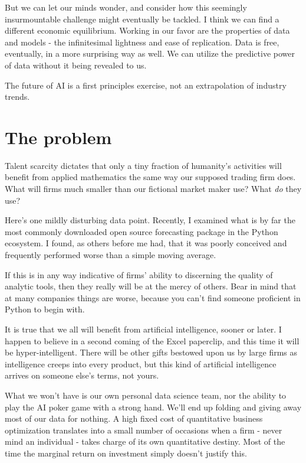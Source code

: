 But we can let our minds wonder, and consider how this seemingly insurmountable challenge might eventually be tackled. I think we can find a different economic equilibrium. Working in our favor are the properties of data and models - the infinitesimal lightness and ease of replication. Data is free, eventually, in a more surprising way as well. We can utilize the predictive power of data without it being revealed to us. 

The future of AI is a first principles exercise, not an extrapolation of industry trends. 


\section{The problem}

Talent scarcity dictates that only a tiny fraction of humanity's activities will benefit from applied mathematics the same way our supposed trading firm does. What will firms much smaller than our fictional market maker use? What {\em do} they use? 

Here's one mildly disturbing data point. Recently, I examined what is by far the most commonly downloaded open source forecasting package in the Python ecosystem. I found, as others before me had, that it was poorly conceived and frequently performed worse than a simple moving average. 

If this is in any way indicative of firms' ability to discerning the quality of analytic tools, then they really will be at the mercy of others. Bear in mind that at many companies things are worse, because you can't find someone proficient in Python to begin with. 

It is true that we all will benefit from artificial intelligence, sooner or later. I happen to believe in a second coming of the Excel paperclip, and this time it will be hyper-intelligent. There will be other gifts bestowed upon us by large firms as intelligence creeps into every product, but this kind of artificial intelligence arrives on someone else's terms, not yours.   

What we won't have is our own personal data science team, nor the ability to play the AI poker game with a strong hand. We'll end up folding and giving away most of our data for nothing. A high fixed cost of quantitative business optimization translates into a small number of occasions when a firm - never mind an individual - takes charge of its own quantitative destiny. Most of the time the marginal return on investment simply doesn't justify this. 

